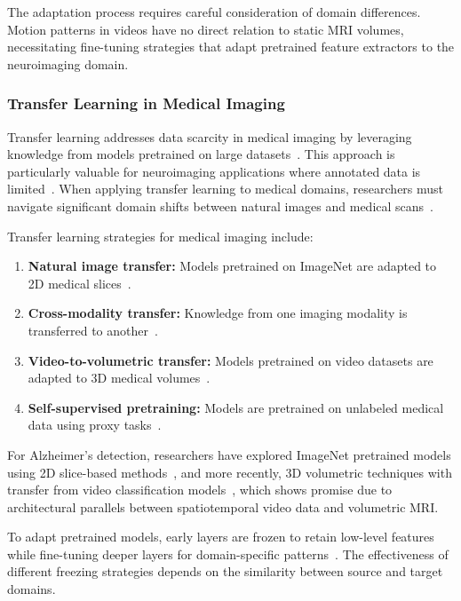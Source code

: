 \documentclass[11pt, a4paper]{article}
\begin{document}
The adaptation process requires careful consideration of domain differences. Motion patterns in videos have no direct relation to static MRI volumes, necessitating fine-tuning strategies that adapt pretrained feature extractors to the neuroimaging domain.

\subsubsection{Transfer Learning in Medical Imaging}

Transfer learning addresses data scarcity in medical imaging by leveraging knowledge from models pretrained on large datasets~\cite{hon2017towards}. This approach is particularly valuable for neuroimaging applications where annotated data is limited~\cite{ebrahimi2019transfer}. When applying transfer learning to medical domains, researchers must navigate significant domain shifts between natural images and medical scans~\cite{mehmood2021transfer}.

Transfer learning strategies for medical imaging include:
\begin{enumerate}
\item \textbf{Natural image transfer:} Models pretrained on ImageNet are adapted to 2D medical slices~\cite{maqsood2019transfer}.
\item \textbf{Cross-modality transfer:} Knowledge from one imaging modality is transferred to another~\cite{yang2020mri, kieselmann2021cross}.
\item \textbf{Video-to-volumetric transfer:} Models pretrained on video datasets are adapted to 3D medical volumes~\cite{wu20223d}.
\item \textbf{Self-supervised pretraining:} Models are pretrained on unlabeled medical data using proxy tasks~\cite{tang2022self}.
\end{enumerate}

For Alzheimer's detection, researchers have explored ImageNet pretrained models using 2D slice-based methods~\cite{hon2017towards,maqsood2019transfer}, and more recently, 3D volumetric techniques with transfer from video classification models~\cite{ebrahimi2020introducing}, which shows promise due to architectural parallels between spatiotemporal video data and volumetric MRI.

To adapt pretrained models, early layers are frozen to retain low-level features while fine-tuning deeper layers for domain-specific patterns~\cite{acharya2021alzheimer}. The effectiveness of different freezing strategies depends on the similarity between source and target domains.
\end{document}

